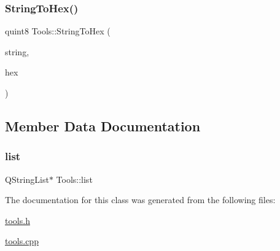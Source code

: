 \mbox{\label{class_tools_a724c823ede8cd11880888f64b1a3c4df}} 
\subsubsection{\texorpdfstring{StringToHex()}{StringToHex()}}
{\footnotesize\ttfamily quint8 Tools\+::\+String\+To\+Hex (\begin{DoxyParamCaption}\item[{Q\+String}]{string,  }\item[{quint8 $\ast$}]{hex }\end{DoxyParamCaption})}



\subsection{Member Data Documentation}
\mbox{\label{class_tools_a2d01c59dccd50660c98f9ad7ee13f5d0}} 
\subsubsection{\texorpdfstring{list}{list}}
{\footnotesize\ttfamily Q\+String\+List$\ast$ Tools\+::list\hspace{0.3cm}{\ttfamily [private]}}



The documentation for this class was generated from the following files\+:\begin{DoxyCompactItemize}
\item 
\mbox{\hyperlink{tools_8h}{tools.\+h}}\item 
\mbox{\hyperlink{tools_8cpp}{tools.\+cpp}}\end{DoxyCompactItemize}
